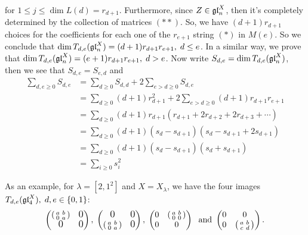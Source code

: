 for $1\leq j\leq \dim L(d)=r_{d+1}$. Furthermore, since $Z\in\mathfrak{gl}_n^X$, then it's completely determined by the collection of 
matrices $(**)$.
So, we have $(d+1)r_{d+1}$ choices for the coefficients for each one of the 
$r_{e+1}$ string $(*)$ in $M(e)$. So we conclude that $\dim T_{d,e}(\mathfrak{gl}_n^X)=(d+1)r_{d+1}r_{e+1},\;d\leq e$. In a similar way, 
we prove that $\dim T_{d,e}(\mathfrak{gl}_n^X)=(e+1)r_{d+1}r_{e+1},\;d>e$. Now write $S_{d,e}=\dim T_{d,e}(\mathfrak{gl}_n^X)$, then 
we see that $S_{d,e}=S_{e,d}$ and 
\begin{equation}
    \begin{split}
        \sum_{d,e\geq0}S_{d,e}&=\sum_{d\geq0}S_{d,d} + 2\sum_{e>d\geq0}S_{d,e}\\
        &=\sum_{d\geq0}(d+1)r_{d+1}^2 + 2\sum_{e>d\geq0}(d+1)r_{d+1}r_{e+1}\\
        &=\sum_{d\geq0}(d+1)r_{d+1}(r_{d+1}+2r_{d+2}+2r_{d+3}+\cdots)\\
        &=\sum_{d\geq0}(d+1)(s_d-s_{d+1})(s_d-s_{d+1} + 2s_{d+1})\\
        &=\sum_{d\geq0}(d+1)(s_d-s_{d+1})(s_d+s_{d+1})\\
        &=\sum_{i\geq0}s_i^2
    \end{split}
\end{equation}


As an example, for $\lambda=[2,1^2]$ and $X=X_\lambda$, we have the four images $T_{d,e}(\mathfrak{gl}_4^X),\;d,e\in\{0,1\}$:
\begin{equation}
\begin{pmatrix}
    \left(\begin{smallmatrix} a & b \\ 0 & a \end{smallmatrix}\right) & \text{\large 0} \\
    \text{\large 0} & \text{\large 0}
\end{pmatrix},\;
\begin{pmatrix}
   \text{\large 0}  & \text{\large 0} \\
    \left(\begin{smallmatrix} a & b \\ 0 & a \end{smallmatrix}\right) & \text{\large 0}
\end{pmatrix},\;
\begin{pmatrix}
    0&\left(\begin{smallmatrix} a & b \\ 0 & 0 \end{smallmatrix}\right)\\0&0
\end{pmatrix}\;\text{ and }
\begin{pmatrix}
    0&0\\0&\left(\begin{smallmatrix} a & b \\ c & d \end{smallmatrix}\right)
\end{pmatrix}.
\end{equation}


